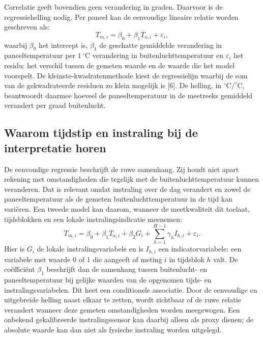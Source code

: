 \documentclass[12pt,a4paper]{article}
\begin{document}
Correlatie geeft bovendien geen verandering in graden. Daarvoor is de regressiehelling nodig. Per paneel kan de eenvoudige lineaire relatie worden geschreven als:
\begin{equation}
T_{m,i}=\beta_0+\beta_1T_{a,i}+\varepsilon_i,
\label{eq:ols}
\end{equation}
waarbij \(\beta_0\) het intercept is, \(\beta_1\) de geschatte gemiddelde verandering in paneeltemperatuur per \(1\,^\circ\mathrm{C}\) verandering in buitenluchttemperatuur en \(\varepsilon_i\) het residu: het verschil tussen de gemeten waarde en de waarde die het model voorspelt. De kleinste-kwadratenmethode kiest de regressielijn waarbij de som van de gekwadrateerde residuen zo klein mogelijk is [6]. De helling, in \(^\circ\mathrm{C}/^\circ\mathrm{C}\), beantwoordt daarmee hoeveel de paneeltemperatuur in de meetreeks gemiddeld verandert per graad buitenlucht.

\subsection{Waarom tijdstip en instraling bij de interpretatie horen}

De eenvoudige regressie beschrijft de ruwe samenhang. Zij houdt niet apart rekening met omstandigheden die tegelijk met de buitenluchttemperatuur kunnen veranderen. Dat is relevant omdat instraling over de dag verandert en zowel de paneeltemperatuur als de gemeten buitenluchttemperatuur in de tijd kan variëren. Een tweede model kan daarom, wanneer de meetkwaliteit dit toelaat, tijdsblokken en een lokale instralingsindicatie meenemen:
\begin{equation}
T_{m,i}=\beta_0+\beta_1T_{a,i}+\beta_2G_i+
\sum_{h=1}^{H-1}\gamma_h I_{h,i}+\varepsilon_i.
\label{eq:adjusted}
\end{equation}
Hier is \(G_i\) de lokale instralingsvariabele en is \(I_{h,i}\) een indicatorvariabele: een variabele met waarde 0 of 1 die aangeeft of meting \(i\) in tijdsblok \(h\) valt. De coëfficiënt \(\beta_1\) beschrijft dan de samenhang tussen buitenlucht- en paneeltemperatuur bij gelijke waarden van de opgenomen tijds- en instralingsvariabelen. Dit heet een conditionele associatie. Door de eenvoudige en uitgebreide helling naast elkaar te zetten, wordt zichtbaar of de ruwe relatie verandert wanneer deze gemeten omstandigheden worden meegewogen. Een onbekend gekalibreerde instralingssensor kan daarbij alleen als proxy dienen; de absolute waarde kan dan niet als fysische instraling worden uitgelegd.
\end{document}
